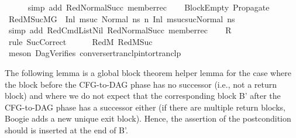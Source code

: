 \begin{isabellebody}
\ \ \ \ \isamarkupfalse%
\ {\isacharparenleft}{\kern0pt}simp\ add{\isacharcolon}{\kern0pt}\ RedNormalSucc\ member{\isacharunderscore}{\kern0pt}rec{\isacharparenleft}{\kern0pt}{}{\isacharparenright}{\kern0pt}{\isacharparenright}{\kern0pt}\isanewline
\ \ \isamarkupfalse%
\ Block{}Empty\ Propagate{}\ \isamarkupfalse%
\ RedM{}Suc{\isacharcolon}{\kern0pt}{\isachardoublequoteopen}M{\isacharcomma}{\kern0pt}{\isasymLambda}{\isacharcomma}{\kern0pt}{\isasymGamma}{\isacharcomma}{\kern0pt}{\isasymOmega}{\isacharcomma}{\kern0pt}G{}\ {\isasymturnstile}\ {\isacharparenleft}{\kern0pt}Inl\ m{}{\isacharunderscore}{\kern0pt}suc{\isacharcomma}{\kern0pt}\ Normal\ ns{}{\isacharparenright}{\kern0pt}\ {\isacharminus}{\kern0pt}n{\isasymrightarrow}\ {\isacharparenleft}{\kern0pt}Inl\ m{}{\isacharunderscore}{\kern0pt}suc{\isacharunderscore}{\kern0pt}suc{\isacharcomma}{\kern0pt}Normal\ ns{}{\isacharparenright}{\kern0pt}{\isachardoublequoteclose}\isanewline
\ \ \ \ \isamarkupfalse%
\ {\isacharparenleft}{\kern0pt}simp\ add{\isacharcolon}{\kern0pt}\ RedCmdListNil\ RedNormalSucc\ member{\isacharunderscore}{\kern0pt}rec{\isacharparenleft}{\kern0pt}{}{\isacharparenright}{\kern0pt}{\isacharparenright}{\kern0pt}\isanewline
\ \ \isamarkupfalse%
\ {\isachardoublequoteopen}R{\isachardoublequoteclose}\isanewline
\ \ \ \ \isamarkupfalse%
\ {\isacharparenleft}{\kern0pt}rule\ SucCorrect{\isacharparenright}{\kern0pt}\isanewline
\ \ \ \ \isamarkupfalse%
\ RedM{}\ RedM{}Suc\isanewline
\ \ \ \ \isamarkupfalse%
\ {\isacharparenleft}{\kern0pt}meson\ DagVerifies\ converse{\isacharunderscore}{\kern0pt}rtranclp{\isacharunderscore}{\kern0pt}into{\isacharunderscore}{\kern0pt}rtranclp{\isacharparenright}{\kern0pt}\isanewline
{}\isamarkupfalse%
%
\endisatagproof
{\isafoldproof}%
%
\isadelimproof
%
\endisadelimproof
%
\begin{isamarkuptext}%
The following lemma is a global block theorem helper lemma for the case where the block
before the CFG-to-DAG phase has no successor (i.e., not a return block) and where we do not expect
that the corresponding block B' after the CFG-to-DAG phase has a successor either (if there are multiple
return blocks, Boogie adds a new unique exit block). Hence, the assertion of the postcondition should
is inserted at the end of B'.%
\end{isamarkuptext}\isamarkuptrue%

\end{isabellebody}
